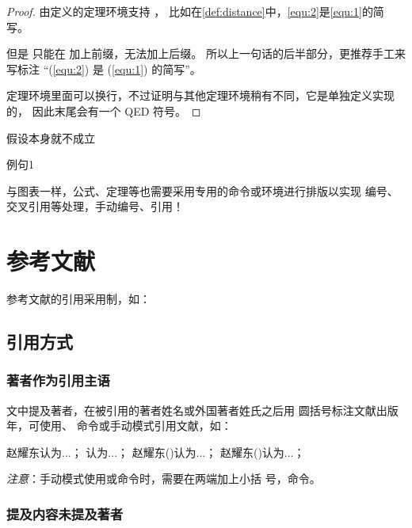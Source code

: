 \begin{proof}
由定义的定理环境支持 ，
比如在\autoref{def:distance}中，\autoref{equ:2}是\autoref{equ:1}的简写。

但是  只能在  加上前缀，无法加上后缀。
所以上一句话的后半部分，更推荐手工来写标注 “(\ref{equ:2}) 是 (\ref{equ:1}) 的简写”。

定理环境里面可以换行，不过证明与其他定理环境稍有不同，它是单独定义实现的，
因此末尾会有一个 QED 符号。
\end{proof}

\begin{assumption}
\label{assume:fail}
假设本身就不成立
\end{assumption}

\begin{lines}
\label{s1}
例句1
\end{lines}

与图表一样，公式、定理等也需要采用专用的命令或环境进行排版以实现
编号、交叉引用等处理，手动编号、引用！

\section{参考文献}
\label{sec:bib}
参考文献的引用采用制，如：

\subsection{引用方式}
\subsubsection{著者作为引用主语}

文中提及著者，在被引用的著者姓名或外国著者姓氏之后用
圆括号标注文献出版年，可使用、
命令或手动模式引用文献，如：

赵耀东认为...；
\textcite{赵耀东1998--}认为...；
赵耀东(\cite*{赵耀东1998--})认为...；
赵耀东(\citeyear{赵耀东1998--})认为...；

\emph{注意}：手动模式使用或命令时，需要在两端加上小括
  号，命令。

\subsubsection{提及内容未提及著者}

